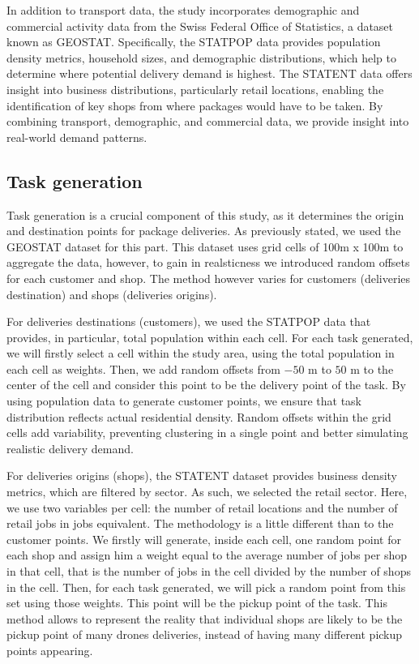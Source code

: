 In addition to transport data, the study incorporates demographic and commercial activity data from the Swiss Federal Office of Statistics, a dataset known as GEOSTAT. Specifically, the STATPOP data provides population density metrics, household sizes, and demographic distributions, which help to determine where potential delivery demand is highest. The STATENT data offers insight into business distributions, particularly retail locations, enabling the identification of key shops from where packages would have to be taken. By combining transport, demographic, and commercial data, we provide insight into real-world demand patterns.

\subsection{Task generation}

Task generation is a crucial component of this study, as it determines the origin and destination points for package deliveries. As previously stated, we used the GEOSTAT dataset for this part. This dataset uses grid cells of 100m x 100m to aggregate the data, however, to gain in realsticness we introduced random offsets for each customer and shop. The method however varies for customers (deliveries destination) and shops (deliveries origins).

For deliveries destinations (customers), we used the STATPOP data that provides, in particular, total population within each cell. For each task generated, we will firstly select a cell within the study area, using the total population in each cell as weights. Then, we add random offsets from $-50 \textrm{ m}$ to $50 \textrm{ m}$ to the center of the cell and consider this point to be the delivery point of the task. By using population data to generate customer points, we ensure that task distribution reflects actual residential density. Random offsets within the grid cells add variability, preventing clustering in a single point and better simulating realistic delivery demand.

For deliveries origins (shops), the STATENT dataset provides business density metrics, which are filtered by sector. As such, we selected the retail sector. Here, we use two variables per cell: the number of retail locations and the number of retail jobs in jobs equivalent. The methodology is a little different than to the customer points. We firstly will generate, inside each cell, one random point for each shop and assign him a weight equal to the average number of jobs per shop in that cell, that is the number of jobs in the cell divided by the number of shops in the cell. Then, for each task generated, we will pick a random point from this set using those weights. This point will be the pickup point of the task. This method allows to represent the reality that individual shops are likely to be the pickup point of many drones deliveries, instead of having many different pickup points appearing.
 
